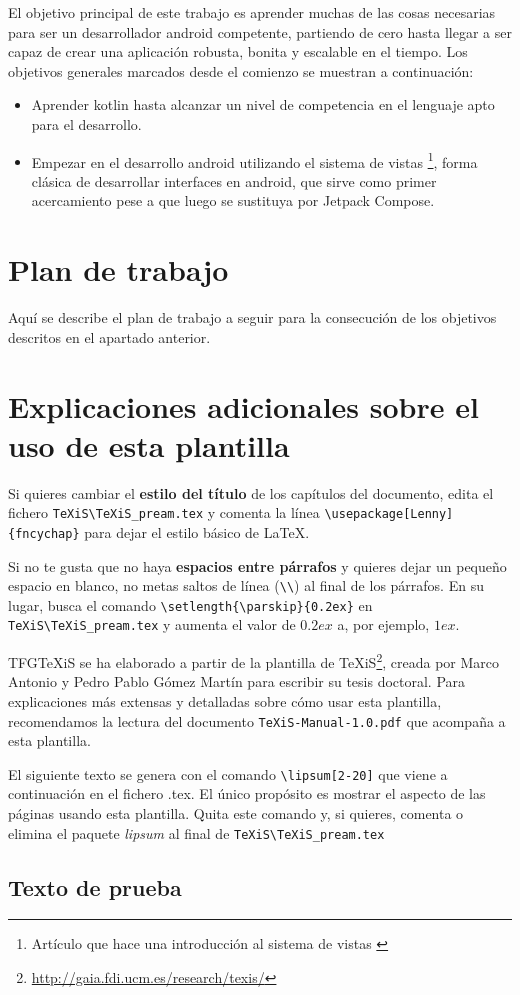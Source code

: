 El objetivo principal de este trabajo es aprender muchas de las cosas necesarias para ser un desarrollador android competente, partiendo de cero hasta llegar a ser capaz de crear una aplicación robusta, bonita y escalable en el tiempo. Los objetivos generales marcados desde el comienzo se muestran a continuación:
\begin{itemize}
	\item Aprender kotlin hasta alcanzar un nivel de competencia en el lenguaje apto para el desarrollo.
	\item Empezar en el desarrollo android utilizando el sistema de vistas \footnote{Artículo que hace una introducción al sistema de vistas \cite{androidViews} }, forma clásica de desarrollar interfaces en android, que sirve como primer acercamiento pese a que luego se sustituya por Jetpack Compose. 
\end{itemize}


\section{Plan de trabajo}
Aquí se describe el plan de trabajo a seguir para la consecución de los objetivos descritos en el apartado anterior.



\section{Explicaciones adicionales sobre el uso de esta plantilla}
Si quieres cambiar el \textbf{estilo del título} de los capítulos del documento, edita el fichero \verb|TeXiS\TeXiS_pream.tex| y comenta la línea \verb|\usepackage[Lenny]{fncychap}| para dejar el estilo básico de \LaTeX.

Si no te gusta que no haya \textbf{espacios entre párrafos} y quieres dejar un pequeño espacio en blanco, no metas saltos de línea (\verb|\\|) al final de los párrafos. En su lugar, busca el comando  \verb|\setlength{\parskip}{0.2ex}| en \verb|TeXiS\TeXiS_pream.tex| y aumenta el valor de $0.2ex$ a, por ejemplo, $1ex$.

TFGTeXiS se ha elaborado a partir de la plantilla de TeXiS\footnote{\url{http://gaia.fdi.ucm.es/research/texis/}}, creada por Marco Antonio y Pedro Pablo Gómez Martín para escribir su tesis doctoral. Para explicaciones más extensas y detalladas sobre cómo usar esta plantilla, recomendamos la lectura del documento \texttt{TeXiS-Manual-1.0.pdf} que acompaña a esta plantilla.

El siguiente texto se genera con el comando \verb|\lipsum[2-20]| que viene a continuación en el fichero .tex. El único propósito es mostrar el aspecto de las páginas usando esta plantilla. Quita este comando y, si quieres, comenta o elimina el paquete \textit{lipsum} al final de \verb|TeXiS\TeXiS_pream.tex|

\subsection{Texto de prueba}


\lipsum[2-20]